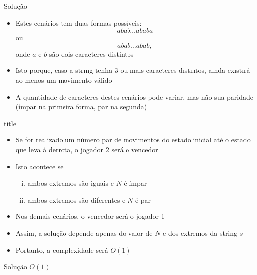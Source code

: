 \begin{frame}[fragile]{Solução}

    \begin{itemize}
        \item Estes cenários tem duas formas possíveis:
        \[
            abab\ldots ababa
        \] 
        ou
        \[
            abab\ldots abab,
        \] 
        onde $a$ e $b$ são dois caracteres distintos

        \item Isto porque, caso a string tenha 3 ou mais caracteres distintos, ainda existirá
            ao menos um movimento válido 
            
        \item A quantidade de caracteres destes cenários pode variar, mas não sua paridade
            (ímpar na primeira forma, par na segunda)
    \end{itemize}

\end{frame}


\begin{frame}[fragile]{title}

    \begin{itemize}
        \item Se for realizado um número par de movimentos do estado inicial até o estado que
            leva à derrota, o jogador 2 será o vencedor

        \item Isto acontece se 
        \begin{enumerate}[(i)]
            \item ambos extremos são iguais e $N$ é ímpar
            \item ambos extremos são diferentes e $N$ é par
        \end{enumerate}

        \item Nos demais cenários, o vencedor será o jogador 1

        \item Assim, a solução depende apenas do valor de $N$ e dos extremos da string $s$

        \item Portanto, a complexidade será $O(1)$
    \end{itemize}

\end{frame}
\begin{frame}[fragile]{Solução $O(1)$}
\end{frame}
